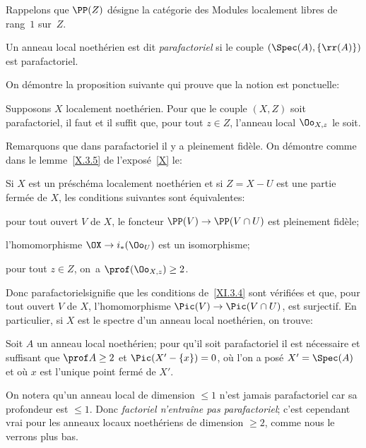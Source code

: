 Rappelons que $\PP(Z)$ d\'esigne la cat\'egorie des Modules localement libres de rang~$1$ sur~$Z$.

\begin{definition} \label{XI.3.2}
Un anneau local noeth\'erien est dit \emph{parafactoriel} si le couple $(\Spec(A), \{\rr(A)\})$ est parafactoriel.
\end{definition}

On d\'emontre la proposition suivante qui prouve que la notion est \og ponctuelle\fg:

\begin{proposition} \label{XI.3.3}
Supposons $X$ localement noeth\'erien. Pour que le couple $(X, Z)$ soit parafactoriel, il faut et il suffit que, pour tout $z\in Z$, l'anneau local $\Oo_{X, z}$ le soit.
\end{proposition}

Remarquons que dans parafactoriel il y a \og pleinement fid\`ele\fg. On d\'emontre comme dans le lemme~\ref{X.3.5} de l'expos\'e~\ref{X} le:

\begin{lemme} \label{XI.3.4}
Si $X$ est un pr\'esch\'ema localement noeth\'erien et si $Z=X-U$ est une partie ferm\'ee de $X$, les conditions suivantes sont \'equivalentes:
\begin{enumeratei}
\item
pour tout ouvert $V$ de $X$, le foncteur $\PP(V)\to \PP(V\cap U)$ est pleinement fid\`ele;
\item
l'homomorphisme $\OX \to i_*(\Oo_U)$ est un isomorphisme;
\item
pour tout $z\in Z$, on~a $\prof(\Oo_{X, z})\geq 2$.
\end{enumeratei}
\end{lemme}

Donc \og parafactoriel\fg signifie que les conditions de~\ref{XI.3.4} sont v\'erifi\'ees et que, pour tout ouvert $V$ de $X$, l'homomorphisme $\Pic(V)\to\Pic(V\cap U)$, est surjectif. En particulier, si $X$ est le spectre d'un anneau local noeth\'erien, on trouve:

\begin{proposition} \label{XI.3.5}
Soit $A$ un anneau local noeth\'erien; pour qu'il soit parafactoriel il est n\'ecessaire et suffisant que $\prof A\geq 2$ et $\Pic(X'-\{x\})=0$, o\`u l'on a pos\'e $X'=\Spec(A)$ et o\`u $x$ est l'unique point ferm\'e de $X'$.
\end{proposition}

On notera qu'un anneau local de dimension $\leq 1$ n'est jamais parafactoriel car sa profondeur est $\leq 1$. Donc \emph{factoriel n'entraîne pas parafactoriel}; c'est cependant vrai pour les anneaux locaux noeth\'eriens de dimension $\geq 2$, comme nous le verrons plus bas.


